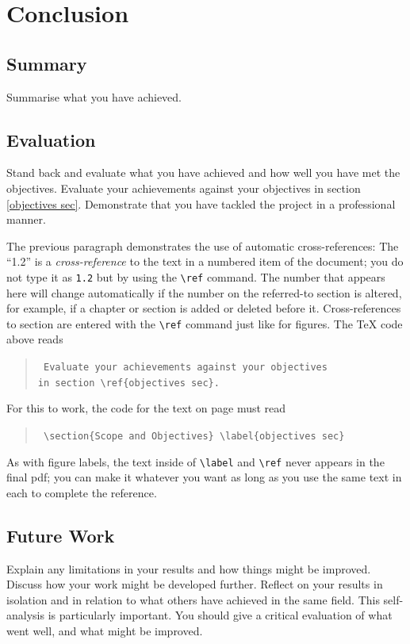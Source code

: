 \documentclass[11pt]{report}
\newcommand{\cmd}[1]{\texttt{\textbackslash{}#1}}
\begin{document}
\chapter{Conclusion}

\section{Summary}
Summarise what you have achieved.

\section{Evaluation}
Stand back and evaluate what you have achieved and how well you have met the objectives. Evaluate your achievements against your objectives in section \ref{objectives sec}. Demonstrate that you have tackled the project in a professional manner. 

The previous paragraph demonstrates the use of automatic cross-references:  The ``1.2'' is a \textit{cross-reference} to the text in a numbered item of the document; you do not type it as \texttt{1.2} but by using the \cmd{ref} command. The number that appears here will change automatically if the number on the referred-to section is altered, for example, if a chapter or section is added or deleted before it. Cross-references to section are entered with the \cmd{ref} command just like for figures. The \TeX{} code above reads
\begin{quote}\tt
	Evaluate your achievements against your objectives \\[-0.5em]
	in section \textbackslash{}ref\{objectives sec\}.
\end{quote}
For this to work, the code for the text on page \pageref{objectives sec} must read
\begin{quote}\tt
	\textbackslash{}section\{Scope and Objectives\} \textbackslash{}label\{objectives sec\}
\end{quote}
As with figure labels, the text inside of \cmd{label} and \cmd{ref} never appears in the final pdf; you can make it whatever you want as long as you use the same text in each to complete the reference.

\section{Future Work}
Explain any limitations in your results and how things might be improved. Discuss how your work might be developed further.  Reflect on your results in isolation and in relation to what others have achieved in the same field. This self-analysis is particularly important.  You should give a critical evaluation of what went well, and what might be improved.
\end{document}

